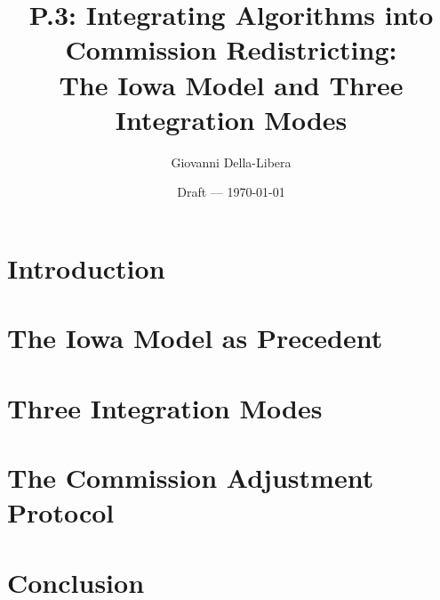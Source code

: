 \documentclass[12pt]{article}
\title{P.3: Integrating Algorithms into Commission Redistricting:\\
       The Iowa Model and Three Integration Modes}
\author{Giovanni Della-Libera}
\date{Draft --- \today}
\begin{document}
\maketitle

\begin{abstract}

\end{abstract}

\newpage
\tableofcontents
\newpage

\section{Introduction}


\section{The Iowa Model as Precedent}


\section{Three Integration Modes}


\section{The Commission Adjustment Protocol}


\section{Conclusion}




\end{document}
